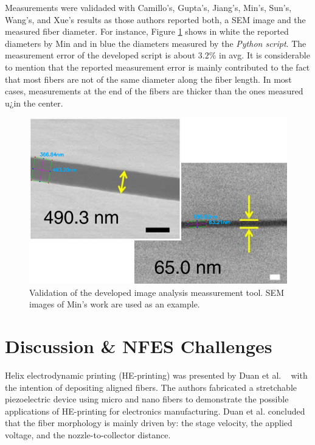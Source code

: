 Measurements were validaded with Camillo's, Gupta's, Jiang's, Min's, Sun's, Wang's, and Xue's \cite{Camillo2013, Gupta2007, Jiang2018, Min2013, Sun2006a, Wang2015, Xue2014} results as those authors reported both, a SEM image and the measured fiber diameter. For instance, Figure \ref{fig:imageAnalysisToolValidation} shows in white the reported diameters by Min and in blue the diameters measured by the \emph{Python script}. The measurement error of the developed script is about $3.2\%$ in avg. It is considerable to mention that the reported measurement error is mainly contributed to the fact that most fibers are not of the same diameter along the fiber length. In most cases, measurements at the end of the fibers are thicker than the ones measured u¿in the center.

\begin{figure}[!th]
\centering
\includegraphics[scale=0.8]{./Figures/imageAnalysisToolValidation.png}
\decoRule
\caption[Validation of the developed image analysis meassurement tool]{{Validation of the developed image analysis meassurement tool. SEM images of Min's work are used as an example. \cite{Min2013}}}
\label{fig:imageAnalysisToolValidation}
\end{figure}

\section{Discussion \& NFES Challenges}

Helix electrodynamic printing (HE-printing) was presented by Duan et al. \unskip~\cite{527120:11974308} with the intention of depositing aligned fibers. The authors fabricated a stretchable piezoelectric device using micro and nano fibers to demonstrate the possible applications of HE-printing for electronics manufacturing. Duan et al. concluded that the fiber morphology is mainly driven by: the stage velocity, the applied voltage, and the nozzle-to-collector distance.


